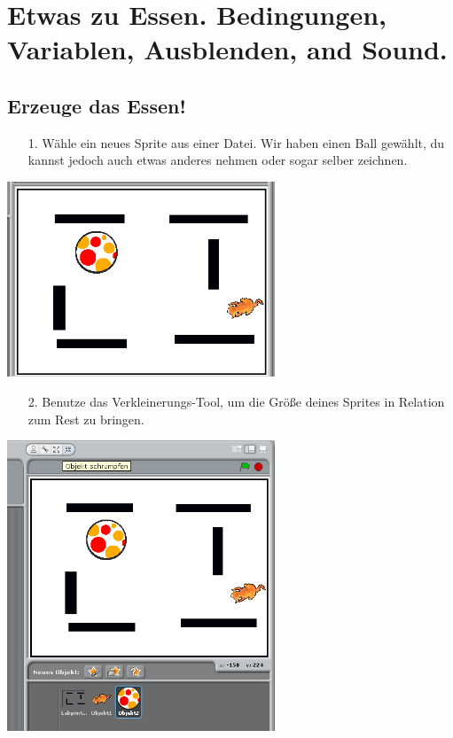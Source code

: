 \section{Etwas zu Essen. Bedingungen, Variablen, Ausblenden, and Sound.}

\subsection{Erzeuge das Essen!}
\begin{itemize}

\item[1.] Wähle ein neues Sprite aus einer Datei. Wir haben einen Ball gewählt, du kannst jedoch auch etwas anderes nehmen oder sogar selber zeichnen.
\end{itemize}
\includegraphics[width=0.6\textwidth]{images/aufgabe3_uebersicht.png}
\begin{itemize}
\item[2.] Benutze das Verkleinerungs-Tool, um die Größe deines Sprites in Relation zum Rest zu bringen.
\end{itemize}
\includegraphics[width=0.6\textwidth]{images/aufgabe3_schrumpfen.png} \newline
